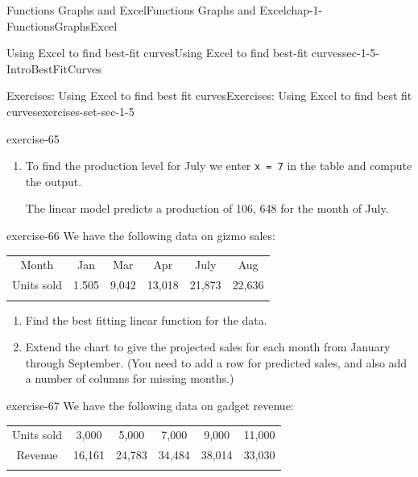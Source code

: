 \documentclass[oneside,10pt,]{book}
\newcommand{\mono}[1]{\texttt{#1}}
\numberwithin{equation}{section}
\newcommand{\hrulethin}  {\noalign{\hrule height 0.04em}}
\newcommand{\hrulemedium}{\noalign{\hrule height 0.07em}}
\newcommand{\hrulethick} {\noalign{\hrule height 0.11em}}
\begin{document}
\begin{chapterptx}{Functions Graphs and Excel}{}{Functions Graphs and Excel}{}{}{chap-1-FunctionsGraphsExcel}
\begin{sectionptx}{Using Excel to find best-fit curves}{}{Using Excel to find best-fit curves}{}{}{sec-1-5-IntroBestFitCurves}
\begin{exercises-subsection-numberless}{Exercises: Using Excel to find best fit curves}{}{Exercises: Using Excel to find best fit curves}{}{}{exercises-set-sec-1-5}
\begin{divisionexercise}{1}{}{}{exercise-65}
\begin{enumerate}[label=(\alph*)]
\begin{sidebyside}{1}{0}{0}{0}
\begin{sbspanel}{1}
\end{sbspanel}%
\end{sidebyside}%
 Excel needs x to be a number, so we need to insert a row and provide the appropriate numerical values: 1 for Jan, 2 for Feb, etc.%
\par
\hypertarget{p-412}{}%
The predicted production for May is 76,432%
\item\hypertarget{li-114}{}\hypertarget{p-413}{}%
To find the production level for July we enter \mono{x = 7} in the table and compute the output.%
\par
\hypertarget{p-414}{}%
The linear model predicts a production of 106, 648 for the month of July.%
\end{enumerate}
\end{divisionexercise}%
\begin{divisionexercise}{2}{}{}{exercise-66}%
\hypertarget{p-415}{}%
We have the following data on gizmo sales:%
\begin{sidebyside}{1}{0}{0}{0}%
\begin{sbspanel}{1}%
{\centering%
\begin{tabular}{cccccc}\hrulethick
Month&Jan&Mar&Apr&July&Aug\tabularnewline\hrulethin
Units sold&1.505&9,042&13,018&21,873&22,636\tabularnewline\hrulemedium
\end{tabular}
\par}
\end{sbspanel}%
\end{sidebyside}%
\leavevmode%
\begin{enumerate}[label=(\alph*)]
\item\hypertarget{li-115}{}\hypertarget{p-416}{}%
Find the best fitting linear function for the data.%
\item\hypertarget{li-116}{}\hypertarget{p-417}{}%
Extend the chart to give the projected sales for each month from January through September.  (You need to add a row for predicted sales, and also add a number of columns for missing months.)%
\end{enumerate}
\end{divisionexercise}%
\begin{divisionexercise}{3}{}{}{exercise-67}%
\hypertarget{p-418}{}%
We have the following data on gadget revenue:%
\begin{sidebyside}{1}{0}{0}{0}%
\begin{sbspanel}{1}%
{\centering%
\begin{tabular}{cccccc}\hrulethick
Units sold&3,000&5,000&7,000&9,000&11,000\tabularnewline\hrulethin
Revenue&16,161&24,783&34,484&38,014&33,030\tabularnewline\hrulemedium

\end{tabular}}
\end{sbspanel}
\end{sidebyside}
\end{divisionexercise}
\end{exercises-subsection-numberless}
\end{sectionptx}
\end{chapterptx}
\end{document}
